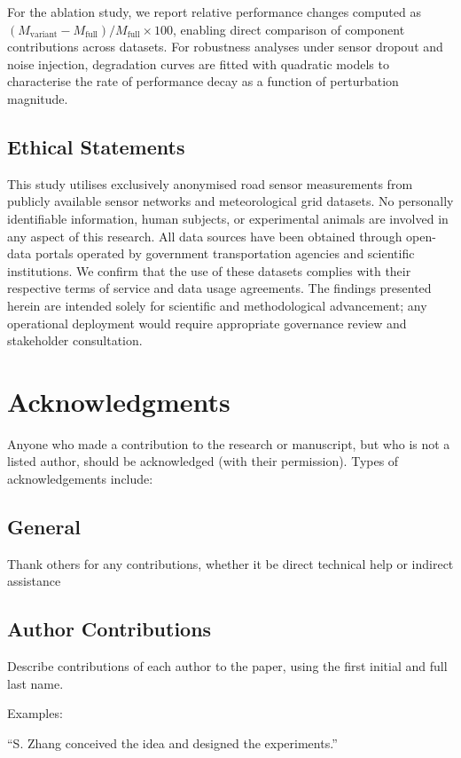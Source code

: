 \documentclass{article}
\begin{document}
For the ablation study, we report relative performance changes computed as $(M_{\mathrm{variant}} - M_{\mathrm{full}}) / M_{\mathrm{full}} \times 100$, enabling direct comparison of component contributions across datasets. For robustness analyses under sensor dropout and noise injection, degradation curves are fitted with quadratic models to characterise the rate of performance decay as a function of perturbation magnitude.

\subsection{Ethical Statements}
This study utilises exclusively anonymised road sensor measurements from publicly available sensor networks and meteorological grid datasets. No personally identifiable information, human subjects, or experimental animals are involved in any aspect of this research. All data sources have been obtained through open-data portals operated by government transportation agencies and scientific institutions. We confirm that the use of these datasets complies with their respective terms of service and data usage agreements. The findings presented herein are intended solely for scientific and methodological advancement; any operational deployment would require appropriate governance review and stakeholder consultation.

\section*{Acknowledgments}
Anyone who made a contribution to the research or manuscript, but who is not a listed author, should be acknowledged (with their permission). Types of acknowledgements include:

\subsection*{General} 
Thank others for any contributions, whether it be direct technical help or indirect assistance 

\subsection*{Author Contributions} 
Describe contributions of each author to the paper, using the first initial and full last name. 

\medskip Examples:

``S. Zhang conceived the idea and designed the experiments.''
\end{document}
